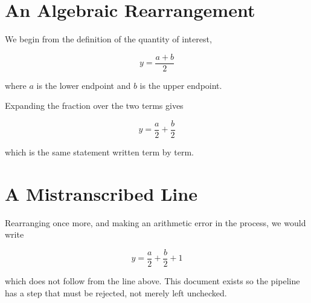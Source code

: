 \documentclass{article}
\begin{document}
\section{An Algebraic Rearrangement}

We begin from the definition of the quantity of interest,

\begin{equation}\tag{1}
y = \frac{a + b}{2}
\end{equation}

where $a$ is the lower endpoint and $b$ is the upper endpoint.

Expanding the fraction over the two terms gives

\begin{equation}\tag{2}
y = \frac{a}{2} + \frac{b}{2}
\end{equation}

which is the same statement written term by term.

\section{A Mistranscribed Line}

Rearranging once more, and making an arithmetic error in the process, we would write

\begin{equation}\tag{3}
y = \frac{a}{2} + \frac{b}{2} + 1
\end{equation}

which does not follow from the line above. This document exists so the pipeline has a step
that must be rejected, not merely left unchecked.
\end{document}
